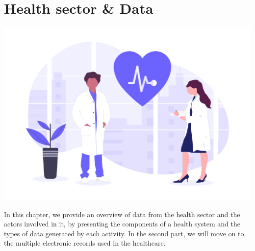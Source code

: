\chapter{Health sector \& Data}
\renewcommand{\thesection}{\arabic{section}}
		




\label{chapitre2}
		
		\includegraphics [width=1 \linewidth, height=0.8\textheight, keepaspectratio] {images/chaptersFigures/health.png}
		
	
		
    \newpage
    \thispagestyle{plain}

In this chapter, we provide an overview of data from the health sector and the actors involved in it, by presenting the components of a health system and the types of data generated by each activity. In the second part, we will move on to the multiple electronic records used in the healthcare.

